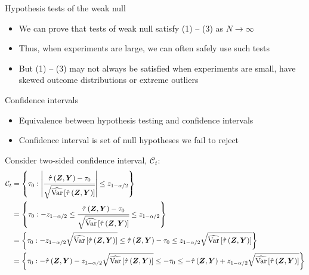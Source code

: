 \documentclass[table, xcolor = {dvipsnames}, 9pt]{beamer}
\theoremstyle{plain}
\DeclareMathOperator{\Var}{\rm{Var}}
\begin{document}
\begin{frame}{Hypothesis tests of the weak null}
\vfill
\begin{itemize} \vfill
\item We can prove that tests of weak null satisfy (1) -- (3) as $N \to \infty$ \vfill
\item Thus, when experiments are large, we can often safely use such tests \vfill
\item But (1) -- (3) may not always be satisfied when experiments are small, have skewed outcome distributions or extreme outliers \vfill
\end{itemize}
\end{frame}
\begin{frame}{Confidence intervals}
\vfill
\begin{itemize} \vfill
\item Equivalence between hypothesis testing and confidence intervals
\item Confidence interval is set of null hypotheses we fail to reject
\end{itemize}
Consider two-sided confidence interval, $\mathcal{C}_t$:
\footnotesize
\begin{equation*}
\begin{split}
\mathcal{C}_t & = \left\{\tau_0 : \left\lvert \cfrac{\hat{\tau}\left(\bm{Z}, \bm{Y}\right)- \tau_0}{\sqrt{\widehat{\Var}\left[\hat{\tau}\left(\bm{Z}, \bm{Y}\right)\right]}} \right\rvert \leq z_{1 - \alpha/2}\right\} \\
& = \left\{\tau_0 : - z_{1 - \alpha/2} \leq \cfrac{\hat{\tau}\left(\bm{Z}, \bm{Y}\right)- \tau_0}{\sqrt{\widehat{\Var}\left[\hat{\tau}\left(\bm{Z}, \bm{Y}\right)\right]}} \leq z_{1 - \alpha/2} \right\} \\
& = \left\{\tau_0 : - z_{1 - \alpha/2} \sqrt{\widehat{\Var}\left[\hat{\tau}\left(\bm{Z}, \bm{Y}\right)\right] }\leq \hat{\tau}\left(\bm{Z}, \bm{Y}\right)- \tau_0 \leq z_{1 - \alpha/2} \sqrt{\widehat{\Var}\left[\hat{\tau}\left(\bm{Z}, \bm{Y}\right)\right] }\right\} \\
& = \left\{\tau_0 : -\hat{\tau}\left(\bm{Z}, \bm{Y}\right)- z_{1 - \alpha/2} \sqrt{\widehat{\Var}\left[\hat{\tau}\left(\bm{Z}, \bm{Y}\right)\right] }\leq - \tau_0 \leq - \hat{\tau}\left(\bm{Z}, \bm{Y}\right)+ z_{1 - \alpha/2} \sqrt{\widehat{\Var}\left[\hat{\tau}\left(\bm{Z}, \bm{Y}\right)\right] }\right\} \\

\end{split}
\end{equation*}
\end{frame}
\end{document}
